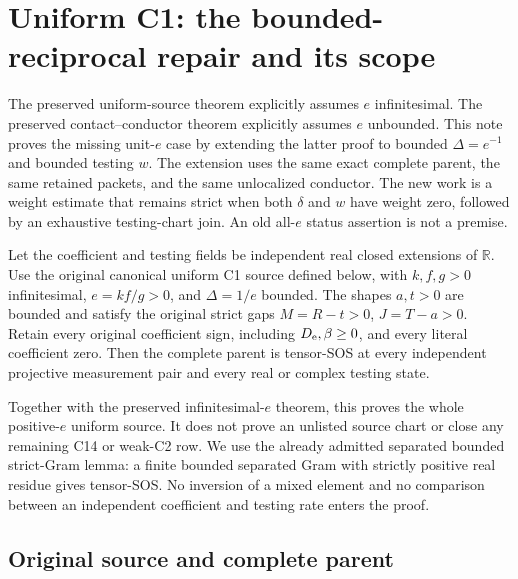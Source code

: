 \section{\texorpdfstring{Uniform C1: the bounded-reciprocal repair and its scope}{Uniform C1: the bounded-reciprocal repair and its scope}}
\label{component:p41b39e2f94e1}


The preserved uniform-source theorem explicitly assumes $e$ infinitesimal.
The preserved contact--conductor theorem explicitly assumes $e$ unbounded.
This note proves the missing unit-$e$ case by extending the latter proof
to bounded $\Delta=e^{-1}$ and bounded testing $w$. The extension uses
the same exact complete parent, the same retained packets, and the same
unlocalized conductor. The new work is a weight estimate that remains
strict when both $\delta$ and $w$ have weight zero, followed by an
exhaustive testing-chart join. An old all-$e$ status assertion is not a
premise.

\begin{theorem}
\label{p41b39e2f94e1:thm:bounded-delta}
Let the coefficient and testing fields be independent real closed
extensions of $\mathbb R$. Use the original canonical uniform C1 source
defined below, with $k,f,g>0$ infinitesimal, $e=kf/g>0$, and
$\Delta=1/e$ bounded. The shapes $a,t>0$ are bounded and satisfy the
original strict gaps $M=R-t>0$, $J=T-a>0$. Retain every original
coefficient sign, including $D_{\rm e},\beta\geq0$, and every literal
coefficient zero. Then the complete parent is tensor-SOS at every
independent projective measurement pair and every real or complex
testing state.
\end{theorem}

Together with the preserved infinitesimal-$e$ theorem, this proves the
whole positive-$e$ uniform source. It does not prove an unlisted source
chart or close any remaining C14 or weak-C2 row. We use the already
admitted separated bounded strict-Gram lemma: a finite bounded separated
Gram with strictly positive real residue gives tensor-SOS. No inversion
of a mixed element and no comparison between an independent coefficient
and testing rate enters the proof.

\subsection*{Original source and complete parent}

